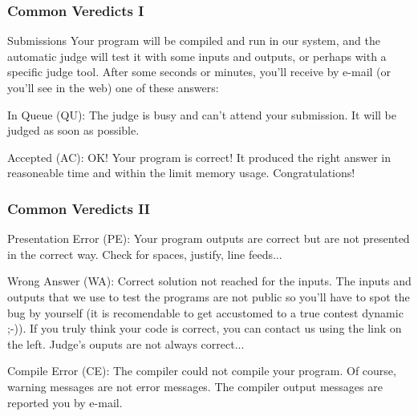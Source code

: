\documentclass{beamer}
\begin{document}
\begin{frame}
	\frametitle {Common Veredicts I}
	\begin{block}{Submissions}
	Your program will be compiled and run in our system, and the automatic judge will test 		it with some inputs and outputs, or perhaps with a specific judge tool. After some 			seconds	or minutes, you'll receive by e-mail (or you'll see in the web) one of these 			answers:
	\end{block}
	
	\begin{block}{In Queue (QU):}
	The judge is busy and can't attend your submission. It will be judged as soon as possible.
	\end{block}

	\begin{block}{Accepted (AC):}
	OK! Your program is correct! It produced the right answer in reasoneable time and within the limit memory usage. Congratulations!
	\end{block}

\end{frame}

\begin{frame}
	\frametitle {Common Veredicts II}
	\begin{block}{Presentation Error (PE):}
	Your program outputs are correct but are not presented in the correct way. Check for spaces, justify, line feeds...
	\end{block}
	
	\begin{block}{Wrong Answer (WA):}
	Correct solution not reached for the inputs. The inputs and outputs that we use to test the programs are not public so you'll have to spot the bug by yourself (it is recomendable to get accustomed to a true contest dynamic ;-)). If you truly think your code is correct, you can contact us using the link on the left. Judge's ouputs are not always correct...
	\end{block}
	
	\begin{block}{Compile Error (CE):}
	The compiler could not compile your program. Of course, warning messages are not error messages. The compiler output messages are reported you by e-mail.
	\end{block}
	
\end{frame}
	
\end{document}
